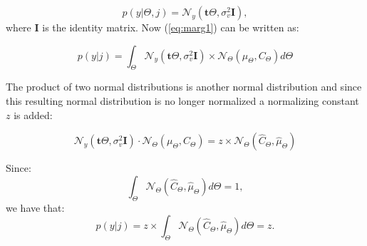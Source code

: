 \begin{equation}\label{eq:probybeta}
p(y|\Theta,j) = \mathcal{N}_y(\textbf{t}\Theta,\sigma_v^2\textbf{I}),
\end{equation}
where $\textbf{I}$ is the identity matrix.
Now (\ref{eq:marg1}) can be written as:

\begin{equation}\label{eq:marg2}
p(y|j) = \int_\Theta \mathcal{N}_y(\textbf{t}\Theta,\sigma_v^2 \textbf{I})\times\mathcal{N}_\Theta(\mu_\Theta,C_\Theta) d\Theta
\end{equation}

The product of two normal distributions is another normal distribution and since this resulting normal distribution is no longer normalized a normalizing constant $z$ is added:

\begin{equation}\label{eq:prod1}
\mathcal{N}_y(\textbf{t}\Theta,\sigma_v^2 \textbf{I})\cdot\mathcal{N}_\Theta(\mu_\Theta,C_\Theta) = z \times \mathcal{N}_\Theta(\hat{C}_\Theta,\hat{\mu}_\Theta)
\end{equation}

Since:
\begin{equation}\label{eq:marg3}
\int_\Theta \mathcal{N}_\Theta(\hat{C}_\Theta,\hat{\mu}_\Theta) d\Theta = 1,
\end{equation}
we have that:
\begin{equation}\label{eq:marg4}
p(y|j) = z \times \int_\Theta \mathcal{N}_\Theta(\hat{C}_\Theta,\hat{\mu}_\Theta) d\Theta = z.
\end{equation}

